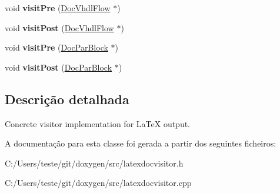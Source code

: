 \begin{DoxyCompactItemize}
\item 
\hypertarget{class_latex_doc_visitor_ab7c53055027c60e0a3a9f4f93e9c3d85}{void {\bfseries visit\-Pre} (\hyperlink{class_doc_vhdl_flow}{Doc\-Vhdl\-Flow} $\ast$)}\label{class_latex_doc_visitor_ab7c53055027c60e0a3a9f4f93e9c3d85}

\item 
\hypertarget{class_latex_doc_visitor_a79febe42f6e032c27aad9a418f979eca}{void {\bfseries visit\-Post} (\hyperlink{class_doc_vhdl_flow}{Doc\-Vhdl\-Flow} $\ast$)}\label{class_latex_doc_visitor_a79febe42f6e032c27aad9a418f979eca}

\item 
\hypertarget{class_latex_doc_visitor_acc4035c695184dd01a26145a88c1a588}{void {\bfseries visit\-Pre} (\hyperlink{class_doc_par_block}{Doc\-Par\-Block} $\ast$)}\label{class_latex_doc_visitor_acc4035c695184dd01a26145a88c1a588}

\item 
\hypertarget{class_latex_doc_visitor_a4bd3a84f45e2f6dc6420638ee8e4ee27}{void {\bfseries visit\-Post} (\hyperlink{class_doc_par_block}{Doc\-Par\-Block} $\ast$)}\label{class_latex_doc_visitor_a4bd3a84f45e2f6dc6420638ee8e4ee27}

\end{DoxyCompactItemize}


\subsection{Descrição detalhada}
Concrete visitor implementation for La\-Te\-X output. 

A documentação para esta classe foi gerada a partir dos seguintes ficheiros\-:\begin{DoxyCompactItemize}
\item 
C\-:/\-Users/teste/git/doxygen/src/latexdocvisitor.\-h\item 
C\-:/\-Users/teste/git/doxygen/src/latexdocvisitor.\-cpp\end{DoxyCompactItemize}
